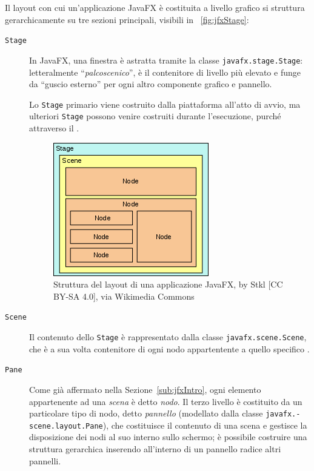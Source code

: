             Il layout con cui un'applicazione JavaFX è costituita a livello grafico si struttura gerarchicamente su tre sezioni principali, visibili in \figurename~\vref{fig:jfxStage}:

            \begin{description}
                \item[\texttt{Stage}]\label{itm:stg} In JavaFX, una finestra è astratta tramite la classe \texttt{javafx\dothyp stage\dothyp Stage}: letteralmente ``\emph{palcoscenico}'',  è il contenitore di livello più elevato e funge da ``guscio esterno'' per ogni altro componente grafico e pannello.

                Lo \texttt{Stage} primario viene costruito dalla piattaforma all'atto di avvio, ma ulteriori \texttt{Stage} possono venire costruiti durante l'esecuzione, purché attraverso il .

            \begin{figure}[htbp]\label{fig:jfxStage}
                \centering
                \includegraphics[scale=1]{img/Javafx-stage-scene-node}
                \caption{Struttura del layout di una applicazione JavaFX, by Stkl [CC BY-SA 4.0], via Wikimedia Commons}
            \end{figure}

                \item[\texttt{Scene}]\label{itm:scn} Il contenuto dello \texttt{Stage} è rappresentato dalla classe \texttt{javafx\dothyp scene\dothyp Scene}, che è a sua volta contenitore di ogni nodo appartentente a quello specifico .

                \item[\texttt{Pane}]\label{itm:pane} Come già affermato nella Sezione~\vref{sub:jfxIntro}, ogni elemento appartenente ad una \emph{scena} è detto \emph{nodo}. Il terzo livello è costituito da un particolare tipo di nodo, detto \emph{pannello} (modellato dalla classe \texttt{javafx\dothyp scene\dothyp layout\dothyp Pane}), che costituisce il contenuto di una scena e gestisce la disposizione dei nodi al suo interno sullo schermo; è possibile costruire una struttura gerarchica inserendo all'interno di un pannello radice altri pannelli.


\end{description}
